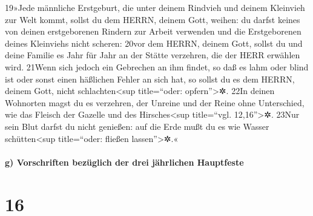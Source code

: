 19»Jede männliche Erstgeburt, die unter deinem Rindvieh und deinem
Kleinvieh zur Welt kommt, sollst du dem HERRN, deinem Gott, weihen: du
darfst keines von deinen erstgeborenen Rindern zur Arbeit verwenden und
die Erstgeborenen deines Kleinviehs nicht scheren: 20vor dem HERRN,
deinem Gott, sollst du und deine Familie es Jahr für Jahr an der Stätte
verzehren, die der HERR erwählen wird. 21Wenn sich jedoch ein Gebrechen
an ihm findet, so daß es lahm oder blind ist oder sonst einen häßlichen
Fehler an sich hat, so sollst du es dem HERRN, deinem Gott, nicht
schlachten\textless sup title=``oder: opfern''\textgreater✲. 22In deinen
Wohnorten magst du es verzehren, der Unreine und der Reine ohne
Unterschied, wie das Fleisch der Gazelle und des Hirsches\textless sup
title=``vgl. 12,16''\textgreater✲. 23Nur sein Blut darfst du nicht
genießen: auf die Erde mußt du es wie Wasser schütten\textless sup
title=``oder: fließen lassen''\textgreater✲.«

\hypertarget{g-vorschriften-bezuxfcglich-der-drei-juxe4hrlichen-hauptfeste}{%
\paragraph{g) Vorschriften bezüglich der drei jährlichen
Hauptfeste}\label{g-vorschriften-bezuxfcglich-der-drei-juxe4hrlichen-hauptfeste}}

\hypertarget{section-15}{%
\section{16}\label{section-15}}

